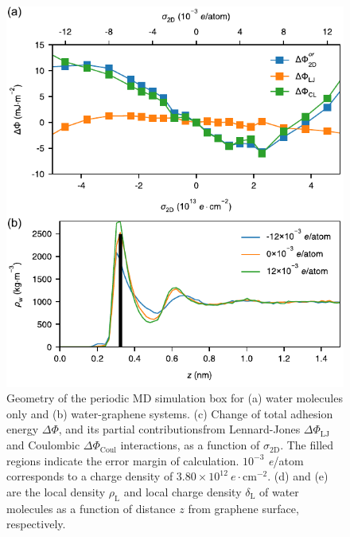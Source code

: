 \documentclass[journal=jacsat,manuscript=article,email=true,hyperref=true,keywords=true]{achemso}
\begin{document}
\begin{figure}[htbp]
\centering
\includegraphics[width=0.9\linewidth]{../img/fig-pot-dens.pdf}
\caption{\label{fig:MD-res}
Geometry of the periodic MD simulation box for (a) water molecules only and (b) water-graphene systems. (c) Change of total adhesion energy \(\Delta\Phi\), and its partial contributionsfrom Lennard-Jones  \(\Delta\Phi_{\mathrm{LJ}}\) and Coulombic  \(\Delta\Phi_{\mathrm{Coul}}\) interactions, as a function of \(\sigma_{\mathrm{2D}}\). The filled regions indicate the error margin of calculation. \(10^{-3}\) \textit{e}/atom corresponds to a charge density of \(3.80 \times 10^{12}\ e \cdot \mathrm{cm}^{-2}\). (d) and (e) are the local density \(\rho_{\mathrm{L}}\) and local charge density \(\delta_{\mathrm{L}}\) of water molecules as a function of distance \(z\) from graphene surface, respectively.}
\end{figure}
\end{document}
